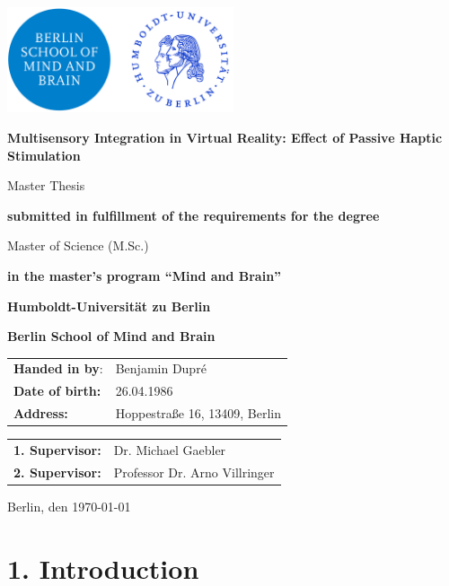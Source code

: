 \documentclass[12pt,oneside,openright]{report}
\begin{document}
\begin{titlepage}
    \centering
    \includegraphics[width=0.5\textwidth]{Hu-logo.png}
    \vspace{2cm}
    
    {\huge \textbf{Multisensory Integration in Virtual Reality: Effect of Passive Haptic Stimulation}\par}
    \vspace{2cm}
    {\LARGE Master Thesis\par}
    \vspace{0.5cm}
    {\textbf{submitted in fulfillment of the requirements for the degree}\par}
    Master of Science (M.Sc.)\par
    {\textbf{in the master's program ``Mind and Brain''}\par}
    \vspace{1.5cm}
    {\textbf{Humboldt-Universität zu Berlin}\par}
    {\textbf{Berlin School of Mind and Brain}\par}
    \vfill
    \raggedright
    \begin{tabular}{ll}
        \textbf{Handed in by}: & Benjamin Dupré \\
        \textbf{Date of birth:} & 26.04.1986\\
       \textbf{ Address:} & Hoppestraße 16, 13409, Berlin \\
    \end{tabular}
    \vfill
    \begin{tabular}{ll}
        \textbf{1. Supervisor:}& Dr. Michael Gaebler \\
        \textbf{2. Supervisor:}& Professor Dr. Arno Villringer  \\
    \end{tabular}
    \vfill
    {Berlin, den \today \par}
\end{titlepage}

\section*{1. Introduction}
\end{document}
